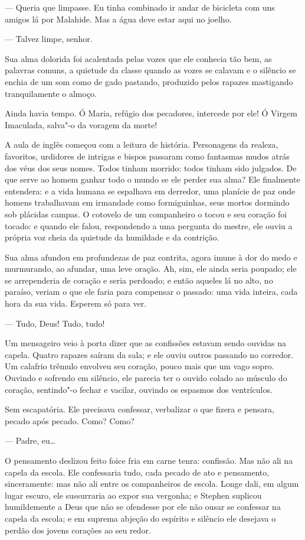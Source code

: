  --- Queria que limpasse. Eu tinha combinado ir andar de bicicleta com uns
amigos lá por Malahide. Mas a água deve estar aqui no joelho.

 --- Talvez limpe, senhor.

Sua alma dolorida foi acalentada pelas vozes que ele conhecia tão bem,
as palavras comuns, a quietude da classe quando as vozes se calavam e o
silêncio se enchia de um som como de gado pastando, produzido pelos
rapazes mastigando tranquilamente o almoço.

Ainda havia tempo. Ó Maria, refúgio dos pecadores, intercede por ele! Ó
Virgem Imaculada, salva"-o da voragem da morte!

A aula de inglês começou com a leitura de história. Personagens da
realeza, favoritos, urdidores de intrigas e bispos passaram como fantasmas mudos 
atrás dos véus dos seus nomes. Todos tinham morrido: todos tinham sido
julgados. De que serve ao homem ganhar todo o mundo se ele perder sua 
alma? Ele finalmente entendera: e a vida humana se espalhava em
derredor, uma planície de paz onde homens trabalhavam em irmandade como
formiguinhas, seus mortos dormindo sob plácidas campas. O cotovelo de
um companheiro o tocou e seu coração foi tocado: e quando ele falou,
respondendo a uma pergunta do mestre, ele ouviu a própria voz cheia da
quietude da humildade e da contrição.

Sua alma afundou em profundezas de paz contrita, agora imune à dor do
medo e murmurando, ao afundar, uma leve oração. Ah, sim, ele ainda
seria poupado; ele se arrependeria de coração e seria perdoado; e então
aqueles lá no alto, no paraíso, veriam o que ele faria para compensar o
passado: uma vida inteira, cada hora da sua vida. Esperem só para ver.

 --- Tudo, Deus! Tudo, tudo!

Um mensageiro veio à porta dizer que as confissões estavam sendo
ouvidas na capela. Quatro rapazes saíram da sala; e ele ouviu outros
passando no corredor. Um calafrio trêmulo envolveu seu coração, pouco
mais que um vago sopro. Ouvindo e sofrendo em silêncio, ele parecia ter
o ouvido colado ao músculo do coração, sentindo"-o fechar e vacilar,
ouvindo os espasmos dos ventrículos.

Sem escapatória. Ele precisava confessar, verbalizar o que fizera e
pensara, pecado após pecado. Como? Como?

 --- Padre, eu\ldots{}

O pensamento deslizou feito foice fria em carne tenra: confissão. Mas
não ali na capela da escola. Ele confessaria tudo, cada pecado de ato e
pensamento, sinceramente: mas não ali entre os companheiros de escola.
Longe dali, em algum lugar escuro, ele sussurraria ao expor sua
vergonha; e Stephen suplicou humildemente a Deus que não se ofendesse
por ele não ousar se confessar na capela da escola; e em suprema
abjeção do espírito e silêncio ele desejava o perdão dos jovens
corações ao seu redor.

